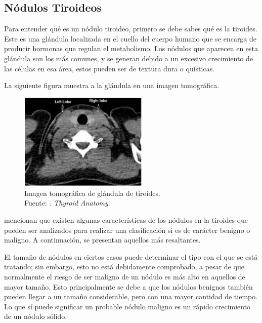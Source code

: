 \subsection{Nódulos Tiroideos}
Para entender qué es un nódulo tiroideo, primero se debe sabes qué es la tiroides. Este es una glándula localizada en el cuello del cuerpo humano que se encarga de producir hormonas que regulan el metabolismo. Los nódulos que aparecen en esta glándula son los más comunes, y se generan debido a un excesivo crecimiento de las células en esa área, estos pueden ser de textura dura o quísticas. \parencite{pr_deng2022autclass}

La siguiente figura muestra a la glándula en una imagen tomográfica.

\begin{figure}[H]
	\begin{center}
		\includegraphics[width=0.55\textwidth]{2/figures/gland_thyroid.png}
		\caption[Imagen tomográfica de glándula de tiroides]{Imagen tomográfica de glándula de tiroides. \\
		Fuente: \cite{pr_binboga2019thyroid}. \textit{Thyroid Anatomy}.}
		\label{2:fig207}
	\end{center}
\end{figure}

\cite{pr_shin2016ultradiag} mencionan que existen algunas características de los nódulos en la tiroides que pueden ser analizados para realizar una clasificación si es de carácter benigno o maligno. A continuación, se presentan aquellos más resaltantes.

El tamaño de nódulos en ciertos casos puede determinar el tipo con el que se está tratando; sin embargo, esto no está debidamente comprobado, a pesar de que normalmente el riesgo de ser maligno de un nódulo es más alto en aquellos de mayor tamaño. Esto principalmente se debe a que los nódulos benignos también pueden llegar a un tamaño considerable, pero con una mayor cantidad de tiempo. Lo que sí puede significar un probable nódulo maligno es un rápido crecimiento de un nódulo sólido.

